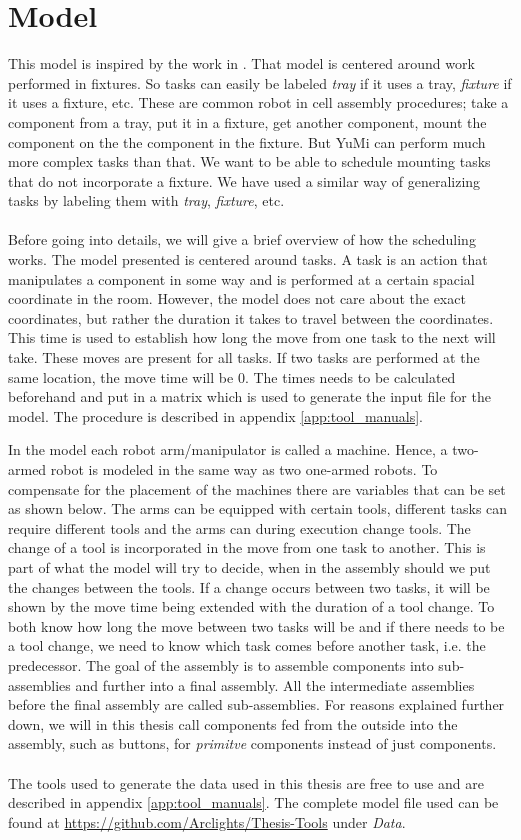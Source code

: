 \chapter{Model}\label{cha:model}

 This model is inspired by the work in \cite{ejenstam_2014}. That model is centered around work performed in fixtures. So tasks can easily be labeled \emph{tray} if it uses a tray, \emph{fixture} if it uses a fixture, etc. These are common robot in cell assembly procedures; take a component from a tray, put it in a fixture, get another component, mount the component on the the component in the fixture. But YuMi can perform much more complex tasks than that. We want to be able to schedule mounting tasks that do not incorporate a fixture. We have used a similar way of generalizing tasks by labeling them with \emph{tray}, \emph{fixture}, etc.
 \\\\
Before going into details, we will give a brief overview of how the scheduling works. The model presented is centered around tasks. A task is an action that manipulates a component in some way and is performed at a certain spacial coordinate in the room. However, the model does not care about the exact coordinates, but rather the duration it takes to travel between the coordinates. This time is used to establish how long the move from one task to the next will take. These moves are present for all tasks. If two tasks are performed at the same location, the move time will be $0$. The times needs to be calculated beforehand and put in a matrix which is used to generate the input file for the model. The procedure is described in appendix \ref{app:tool_manuals}.

In the model each robot arm/manipulator is called a machine. Hence, a two-armed robot is modeled in the same way as two one-armed robots. To compensate for the placement of the machines there are variables that can be set as shown below. The arms can be equipped with certain tools, different tasks can require different tools and the arms can during execution change tools. The change of a tool is incorporated in the move from one task to another. This is part of what the model will try to decide, when in the assembly should we put the changes between the tools. If a change occurs between two tasks, it will be shown by the move time being extended with the duration of a tool change. To both know how long the move between two tasks will be and if there needs to be a tool change, we need to know which task comes before another task, i.e. the predecessor.
\newpage
 The goal of the assembly is to assemble components into sub-assemblies and further into a final assembly. All the intermediate assemblies before the final assembly are called sub-assemblies. For reasons explained further down, we will in this thesis call components fed from the outside into the assembly, such as buttons, for \emph{primitve} components instead of just components.
\\\\
The tools used to generate the data used in this thesis are free to use and are described in appendix \ref{app:tool_manuals}. The complete model file used can be found at \url{https://github.com/Arclights/Thesis-Tools} under \emph{Data}.
 

